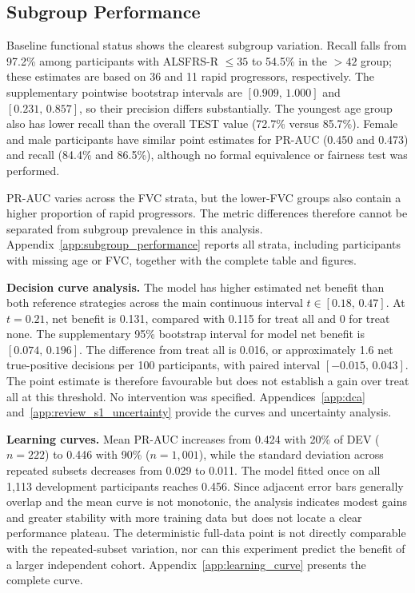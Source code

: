 \subsection{Subgroup Performance}
\label{subsec:results_subgroup}

Baseline functional status shows the clearest subgroup variation. Recall falls from 97.2\% among participants with \gls{ALSFRS-R} $\leq35$ to 54.5\% in the $>42$ group; these estimates are based on 36 and 11 rapid progressors, respectively. The supplementary pointwise bootstrap intervals are $[0.909,\,1.000]$ and $[0.231,\,0.857]$, so their precision differs substantially. The youngest age group also has lower recall than the overall TEST value (72.7\% versus 85.7\%). Female and male participants have similar point estimates for PR-AUC (0.450 and 0.473) and recall (84.4\% and 86.5\%), although no formal equivalence or fairness test was performed.

PR-AUC varies across the \gls{FVC} strata, but the lower-FVC groups also contain a higher proportion of rapid progressors. The metric differences therefore cannot be separated from subgroup prevalence in this analysis. Appendix~\ref{app:subgroup_performance} reports all strata, including participants with missing age or FVC, together with the complete table and figures.

\label{subsec:results_dca}
\noindent\textbf{Decision curve analysis.}
The model has higher estimated net benefit than both reference strategies across the main continuous interval $t\in[0.18,\,0.47]$. At $t=0.21$, net benefit is 0.131, compared with 0.115 for treat all and 0 for treat none. The supplementary 95\% bootstrap interval for model net benefit is $[0.074,\,0.196]$. The difference from treat all is 0.016, or approximately 1.6 net true-positive decisions per 100 participants, with paired interval $[-0.015,\,0.043]$. The point estimate is therefore favourable but does not establish a gain over treat all at this threshold. No intervention was specified. Appendices~\ref{app:dca} and~\ref{app:review_s1_uncertainty} provide the curves and uncertainty analysis.

\label{subsec:results_learning_curves}
\noindent\textbf{Learning curves.}
Mean PR-AUC increases from 0.424 with 20\% of \gls{DEV} ($n=222$) to 0.446 with 90\% ($n=1{,}001$), while the standard deviation across repeated subsets decreases from 0.029 to 0.011. The model fitted once on all 1{,}113 development participants reaches 0.456. Since adjacent error bars generally overlap and the mean curve is not monotonic, the analysis indicates modest gains and greater stability with more training data but does not locate a clear performance plateau. The deterministic full-data point is not directly comparable with the repeated-subset variation, nor can this experiment predict the benefit of a larger independent cohort. Appendix~\ref{app:learning_curve} presents the complete curve.

